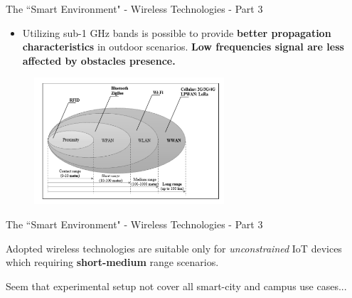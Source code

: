 \documentclass[10pt]{beamer}
\begin{document}
\begin{frame}{The ``Smart Environment" - Wireless Technologies - Part 3}

\begin{itemize}
\justifying

\item Utilizing sub-1 GHz bands is possible to provide \textbf{better  propagation characteristics} in outdoor scenarios. \textbf{Low frequencies signal are less affected by obstacles presence.}
\end{itemize}

\begin{figure}
  \includegraphics[width=200pt]{class.png}
\end{figure}


\end{frame} 
\begin{frame}{The ``Smart Environment" - Wireless Technologies - Part 3}

\begin{block}{}
\justifying
Adopted wireless technologies are suitable only for \textit{unconstrained} IoT devices which requiring \textbf{short-medium} range scenarios. 

Seem that experimental setup not cover all smart-city and campus use cases...
\end{block}

\end{frame} 
\end{document}
